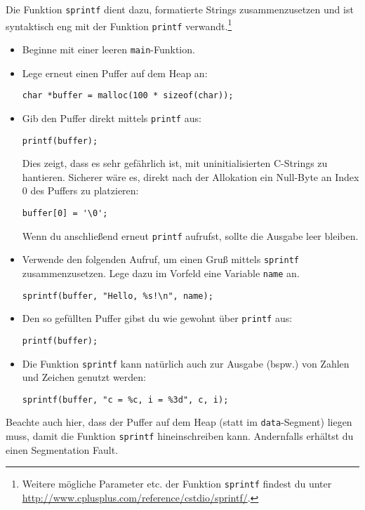 Die Funktion \lstinline{sprintf} dient dazu, formatierte Strings zusammenzusetzen und ist syntaktisch eng mit der Funktion \lstinline{printf} verwandt.\footnote{Weitere mögliche Parameter etc. der Funktion \lstinline{sprintf} findest du unter \url{http://www.cplusplus.com/reference/cstdio/sprintf/}.}
%
\begin{itemize}
\item
Beginne mit einer leeren \lstinline|main|-Funktion.
\item 
Lege erneut einen Puffer auf dem Heap an:

\begin{minipage}{\textwidth}
\begin{lstlisting}
char *buffer = malloc(100 * sizeof(char));
\end{lstlisting}
\end{minipage}

\item 
Gib den Puffer direkt mittels \lstinline|printf| aus:

\begin{minipage}{\textwidth}
\begin{lstlisting}
printf(buffer);
\end{lstlisting}
\end{minipage}

Dies zeigt, dass es sehr gefährlich ist, mit uninitialisierten C-Strings zu hantieren.
Sicherer wäre es, direkt nach der Allokation ein Null-Byte an Index 0 des Puffers zu platzieren:

\begin{minipage}{\textwidth}
\begin{lstlisting}
buffer[0] = '\0';
\end{lstlisting}
\end{minipage}

Wenn du anschließend erneut \lstinline|printf| aufrufst, sollte die Ausgabe leer bleiben.
\item 
Verwende den folgenden Aufruf, um einen Gruß mittels \lstinline|sprintf| zusammenzusetzen.
Lege dazu im Vorfeld eine Variable \lstinline|name| an.
\begin{lstlisting}
sprintf(buffer, "Hello, %s!\n", name);
\end{lstlisting}
\item 
Den so gefüllten Puffer gibst du wie gewohnt über \lstinline|printf| aus:
\begin{lstlisting}
printf(buffer);
\end{lstlisting}
\item 
Die Funktion \lstinline|sprintf| kann natürlich auch zur Ausgabe (bspw.) von Zahlen und Zeichen genutzt werden:
\begin{lstlisting}
sprintf(buffer, "c = %c, i = %3d", c, i);
\end{lstlisting}
\end{itemize}
Beachte auch hier, dass der Puffer auf dem Heap (statt im \texttt{data}-Segment) liegen muss, damit die Funktion \lstinline|sprintf| hineinschreiben kann.
Andernfalls erhältst du einen Segmentation Fault.

